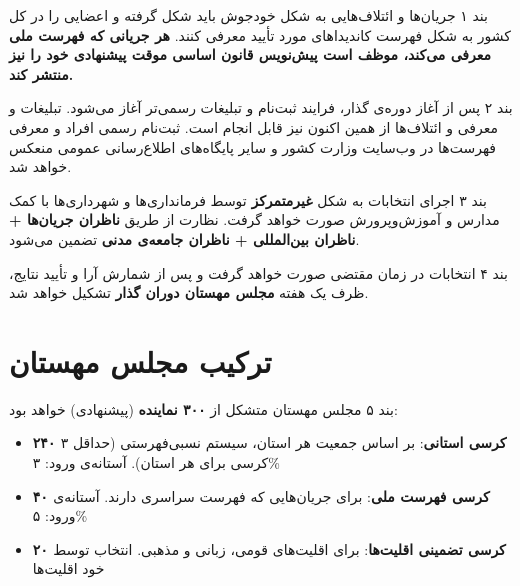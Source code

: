 \documentclass[12pt,a4paper,twoside,openany]{book}
\begin{document}
	\begin{bandbox}{بند ۱}
		جریان‌ها و ائتلاف‌هایی به شکل خودجوش باید شکل گرفته و اعضایی را در کل کشور به شکل
		فهرست کاندیداهای مورد تأیید معرفی کنند. \textbf{هر جریانی که فهرست ملی معرفی می‌کند،
			موظف است پیش‌نویس قانون اساسی موقت پیشنهادی خود را نیز منتشر کند.}
	\end{bandbox}
	
	\begin{bandbox}{بند ۲}
		پس از آغاز دوره‌ی گذار، فرایند ثبت‌نام و تبلیغات رسمی‌تر آغاز می‌شود. تبلیغات و معرفی
		و ائتلاف‌ها از همین اکنون نیز قابل انجام است. ثبت‌نام رسمی افراد و معرفی فهرست‌ها در
		وب‌سایت وزارت کشور و سایر پایگاه‌های اطلاع‌رسانی عمومی منعکس خواهد شد.
	\end{bandbox}
	
	\begin{bandbox}{بند ۳}
		اجرای انتخابات به شکل \textbf{غیرمتمرکز} توسط فرمانداری‌ها و شهرداری‌ها با کمک
		مدارس و آموزش‌وپرورش صورت خواهد گرفت. نظارت از طریق \textbf{ناظران جریان‌ها + ناظران
			بین‌المللی + ناظران جامعه‌ی مدنی} تضمین می‌شود.
	\end{bandbox}
	
	\begin{bandbox}{بند ۴}
		انتخابات در زمان مقتضی صورت خواهد گرفت و پس از شمارش آرا و تأیید نتایج، ظرف یک هفته
		\textbf{مجلس مهستان دوران گذار} تشکیل خواهد شد.
	\end{bandbox}
	
	\section{ترکیب مجلس مهستان}
	
	\begin{bandbox}{بند ۵}
		مجلس مهستان متشکل از \textbf{۳۰۰ نماینده} (پیشنهادی) خواهد بود:
		\begin{itemize}
			\item \textbf{۲۴۰ کرسی استانی}: بر اساس جمعیت هر استان، سیستم نسبی‌فهرستی
			(حداقل ۳ کرسی برای هر استان). آستانه‌ی ورود: ۳\%
			\item \textbf{۴۰ کرسی فهرست ملی}: برای جریان‌هایی که فهرست سراسری دارند.
			آستانه‌ی ورود: ۵\%
			\item \textbf{۲۰ کرسی تضمینی اقلیت‌ها}: برای اقلیت‌های قومی، زبانی و مذهبی.
			انتخاب توسط خود اقلیت‌ها
		\end{itemize}
	\end{bandbox}
	
\end{document}
